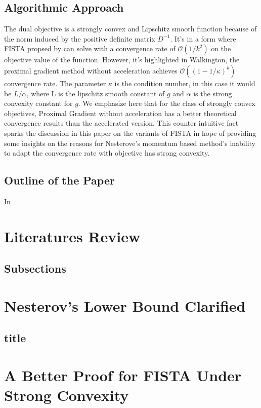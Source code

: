 \documentclass[]{article}
\theoremstyle{definition}
\numberwithin{equation}{subsection}
\begin{document}
    \subsection{Algorithmic Approach}
        The dual objective is a strongly convex and Lipschitz smooth function because of the norm induced by the positive definite matrix $D^{-1}$. 
        It's in a form where FISTA propsed by \cite{beck_fast_2009-1} can solve with a convergence rate of $\mathcal O(1/k^2)$ on the objective value of the function. 
        However, it's highlighted in Walkington\cite{noel_nesterovs_nodate}, the proximal gradient method without acceleration achieves $\mathcal O((1 - 1/\kappa)^k)$ convergence rate. 
        The parameter $\kappa$ is the condition number, in this case it would be $L/\alpha$, where L is the lipschitz smooth constant of $g$ and $\alpha$ is the strong convexity constant for $g$. 
        We emphasize here that for the class of strongly convex objectives, Proximal Gradient without acceleration has a better theoretical convergence results than the accelerated version. 
        This counter intuitive fact sparks the discussion in this paper on the variants of FISTA in hope of providing some insights on the reasons for Nesterove's momentum based method's inability to adapt the convergence rate with objective has strong convexity. 

    \subsection{Outline of the Paper}
        In 
        
        


\section{Literatures Review}\label{sec:Literatures}
    
    \subsection{Subsections}
\section{Nesterov's Lower Bound Clarified}
    \subsection{title}

\section{A Better Proof for FISTA Under Strong Convexity}
    
\end{document}
